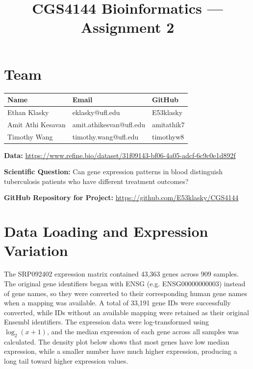 \documentclass[11pt]{article}
\title{\vspace{-1.5cm}CGS4144 Bioinformatics --- Assignment 2}
\author{}
\date{}
\begin{document}
	
	\maketitle
	\vspace{-2cm}
	
	\section*{Team}
	
	\begin{center}
		\begin{tabular}{|>{\raggedright}p{4.5cm}|>{\raggedright}p{5cm}|>{\raggedright\arraybackslash}p{4cm}|}
			\hline
			\textbf{Name} & \textbf{Email} & \textbf{GitHub} \\
			\hline
			Ethan Klasky & eklasky@ufl.edu & E53klasky \\
			\hline
			Amit Athi Kesavan & amit.athikesvan@ufl.edu & amitathik7 \\
			\hline
			Timothy Wang & timothy.wang@ufl.edu & timothyw8 \\
			\hline
		\end{tabular}
	\end{center}
	
	\vspace{0.5em}
	\noindent\textbf{Data:} \url{https://www.refine.bio/dataset/31f09143-bf06-4a05-adcf-6c9c0e1d892f}
	
	\noindent\textbf{Scientific Question:} Can gene expression patterns in blood distinguish tuberculosis patients who have different treatment outcomes?
	
	\noindent\textbf{GitHub Repository for Project:} \url{https://github.com/E53klasky/CGS4144}
	
	\section{Data Loading and Expression Variation}
	
	The SRP092402 expression matrix contained 43{,}363 genes across 909 samples. The original gene identifiers began with ENSG (e.g. ENSG00000000003) instead of gene names, so they were converted to their corresponding human gene names when a mapping was available. A total of 33{,}191 gene IDs were successfully converted, while IDs without an available mapping were retained as their original Ensembl identifiers. The expression data were log-transformed using $\log_2(x+1)$, and the median expression of each gene across all samples was calculated. The density plot below shows that most genes have low median expression, while a smaller number have much higher expression, producing a long tail toward higher expression values.
	
\end{document}
